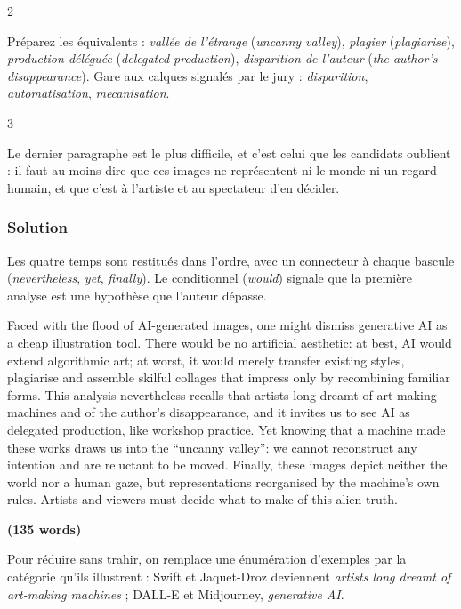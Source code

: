 \documentclass[11pt,a4paper]{article}
\begin{document}
\begin{indication}{2}

Préparez les équivalents : \emph{vallée de l'étrange} (\emph{uncanny valley}), \emph{plagier} (\emph{plagiarise}), \emph{production déléguée} (\emph{delegated production}), \emph{disparition de l'auteur} (\emph{the author's disappearance}). Gare aux calques signalés par le jury : \emph{disparition}, \emph{automatisation}, \emph{mecanisation}.

\end{indication}

\begin{indication}{3}

Le dernier paragraphe est le plus difficile, et c'est celui que les candidats oublient : il faut au moins dire que ces images ne représentent ni le monde ni un regard humain, et que c'est à l'artiste et au spectateur d'en décider.

\end{indication}

\hypertarget{solution-2}{%
\subsubsection{Solution}\label{solution-2}}

Les quatre temps sont restitués dans l'ordre, avec un connecteur à chaque bascule (\emph{nevertheless}, \emph{yet}, \emph{finally}). Le conditionnel (\emph{would}) signale que la première analyse est une hypothèse que l'auteur dépasse.

Faced with the flood of AI-generated images, one might dismiss generative AI as a cheap illustration tool. There would be no artificial aesthetic: at best, AI would extend algorithmic art; at worst, it would merely transfer existing styles, plagiarise and assemble skilful collages that impress only by recombining familiar forms. This analysis nevertheless recalls that artists long dreamt of art-making machines and of the author's disappearance, and it invites us to see AI as delegated production, like workshop practice. Yet knowing that a machine made these works draws us into the ``uncanny valley'': we cannot reconstruct any intention and are reluctant to be moved. Finally, these images depict neither the world nor a human gaze, but representations reorganised by the machine's own rules. Artists and viewers must decide what to make of this alien truth.

\textbf{(135 words)}

\begin{methode}

Pour réduire sans trahir, on remplace une énumération d'exemples par la catégorie qu'ils illustrent : Swift et Jaquet-Droz deviennent \emph{artists long dreamt of art-making machines} ; DALL-E et Midjourney, \emph{generative AI}.

\end{methode}
\end{document}
